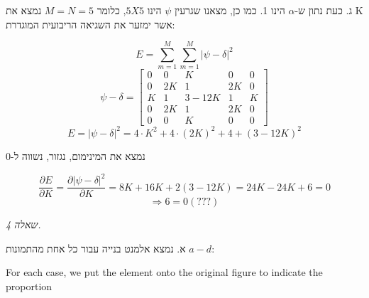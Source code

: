 \documentclass[a4paper]{iacas}
\begin{document}
\begin{hebrew}
ג. כעת נתון ש-$\alpha$ הינו 1. כמו כן, מצאנו שגרעין $\psi$ הינו $5X5$, כלומר $M=N=5$ נמצא את K אשר ימזער את השגיאה הריבועית המוגדרת:
\end{hebrew}
\begin{equation*}
E = \sum_{m=1}^M \sum_{m=1}^M |\psi -\delta|^2
\end{equation*}
\begin{equation*}
\psi -\delta  = \begin{bmatrix}0&0&K&0&0\\0&2K&1&2K&0\\K&1&3-12K&1&K\\0&2K&1&2K&0\\0&0&K&0&0\end{bmatrix}
\end{equation*}
\begin{equation*}
E = |\psi -\delta|^2 = 4\cdot K^2 + 4\cdot (2K)^2 + 4 + (3-12K)^2
\end{equation*}
\begin{hebrew}
נמצא את המינימום, נגזור, נשווה ל-0
\end{hebrew}
\begin{equation*}
\frac{\partial E}{\partial K} = \frac{\partial{|\psi -\delta|^2}}{\partial K} = 8K + 16K + 2(3-12K) = 24K -24K + 6 = 0
\end{equation*}
\begin{equation*}
\Longrightarrow 6 = 0 (???)
\end{equation*}


\newpage

\begin{hebrew}
\textit{\huge שאלה 4.}

א. נמצא אלמנט בנייה עבור כל אחת מהתמונות $a-d$:
\end{hebrew}

For each case, we put the element onto the original figure to indicate the proportion
\end{document}
